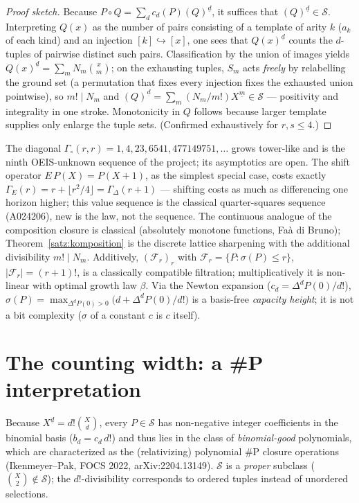 \documentclass[11pt]{article}
\theoremstyle{definition}
\theoremstyle{remark}
\newcommand{\Struk}{\mathcal S}
\begin{document}
\begin{proof}[Proof sketch]
Because $P\circ Q=\sum_d c_d(P)(Q)^{\underline d}$, it suffices
that $(Q)^{\underline d}\in\Struk$. Interpreting $Q(x)$ as the
number of pairs consisting of a template of arity $k$ ($a_k$ of
each kind) and an injection $[k]\hookrightarrow[x]$, one sees that
$Q(x)^{\underline d}$ counts the $d$-tuples of pairwise distinct
such pairs. Classification by the union of images yields
$Q(x)^{\underline d}=\sum_m N_m\binom xm$; on the exhausting
tuples, $S_m$ acts \emph{freely} by relabelling the ground set (a
permutation that fixes every injection fixes the exhausted union
pointwise), so $m!\mid N_m$ and
$(Q)^{\underline d}=\sum_m(N_m/m!)X^{\underline m}\in\Struk$ ---
positivity and integrality in one stroke. Monotonicity in $Q$
follows because larger template supplies only enlarge the tuple
sets.
(Confirmed exhaustively for $r,s\le4$.)
\end{proof}

The diagonal $\Gamma_\circ(r,r)=1,4,23,6541,477149751,\ldots$
grows tower-like and is the ninth OEIS-unknown sequence of the
project; its asymptotics are open. The shift operator
$E\,P(X)=P(X{+}1)$, as the simplest special case, costs exactly
$\Gamma_E(r)=r+\lfloor r^2/4\rfloor=\Gamma_\Delta(r{+}1)$ ---
shifting costs as much as differencing one horizon higher; this
value sequence is the classical quarter-squares sequence (A024206),
new is the law, not the sequence. The continuous analogue of the
composition closure is classical (absolutely monotone functions,
Faà di Bruno); Theorem~\ref{satz:komposition} is the discrete
lattice sharpening with the additional divisibility $m!\mid N_m$.
Additively,
$(\mathcal F_r)_r$ with $\mathcal F_r=\{P:\sigma(P)\le r\}$,
$|\mathcal F_r|=(r{+}1)!$, is a classically compatible filtration;
multiplicatively it is non-linear with optimal growth law
$\beta$. Via the Newton expansion ($c_d=\Delta^dP(0)/d!$),
$\sigma(P)=\max_{\Delta^dP(0)>0}\bigl(d+\Delta^dP(0)/d!\bigr)$ is a
basis-free \emph{capacity height}; it is not a bit complexity
($\sigma$ of a constant $c$ is $c$ itself).

\section{The counting width: a \#P interpretation}

Because $X^{\underline d}=d!\binom Xd$, every $P\in\Struk$ has
non-negative integer coefficients in the binomial basis
($b_d=c_d\,d!$) and thus lies in the class of
\emph{binomial-good} polynomials, which are characterized as the
(relativizing) polynomial \#P closure operations
(Ikenmeyer--Pak, FOCS 2022, arXiv:2204.13149). $\Struk$ is a
\emph{proper} subclass ($\binom X2\notin\Struk$); the
$d!$-divisibility corresponds to ordered tuples instead of
unordered selections.
\end{document}
